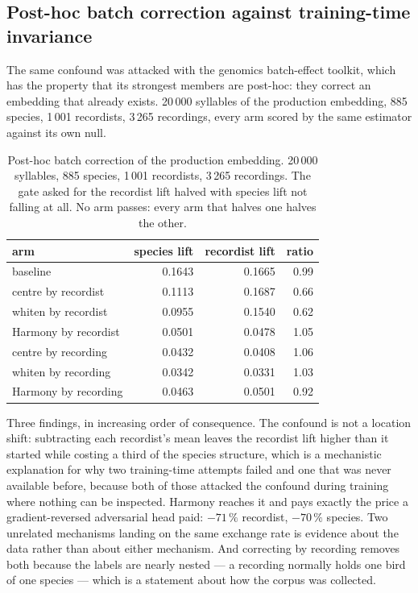 \documentclass[10pt,twocolumn,a4paper]{article}
\begin{document}
\subsection{Post-hoc batch correction against training-time invariance}

The same confound was attacked with the genomics batch-effect toolkit, which has the property
that its strongest members are post-hoc: they correct an embedding that already exists.
20\,000 syllables of the production embedding, 885 species, 1\,001 recordists, 3\,265
recordings, every arm scored by the same estimator against its own null.

\begin{table}[t]
\centering
\small
\caption{Post-hoc batch correction of the production embedding. 20\,000 syllables, 885
species, 1\,001 recordists, 3\,265 recordings. The gate asked for the recordist lift halved
with species lift not falling at all. No arm passes: every arm that halves one halves the
other.}
\label{tab:batch}
\begin{tabular}{L{5.6cm} r r r}
\toprule
arm & species lift & recordist lift & ratio \\
\midrule
baseline & 0.1643 & 0.1665 & 0.99 \\
centre by recordist & 0.1113 & 0.1687 & 0.66 \\
whiten by recordist & 0.0955 & 0.1540 & 0.62 \\
Harmony by recordist & 0.0501 & 0.0478 & 1.05 \\
centre by recording & 0.0432 & 0.0408 & 1.06 \\
whiten by recording & 0.0342 & 0.0331 & 1.03 \\
Harmony by recording & 0.0463 & 0.0501 & 0.92 \\
\bottomrule
\end{tabular}
\end{table}

Three findings, in increasing order of consequence. The confound is not a location shift:
subtracting each recordist's mean leaves the recordist lift higher than it started while
costing a third of the species structure, which is a mechanistic explanation for why two
training-time attempts failed and one that was never available before, because both of those
attacked the confound during training where nothing can be inspected. Harmony
\citep{korsunsky2019} reaches it and pays exactly the price a gradient-reversed adversarial
head paid: $-71\,\%$ recordist, $-70\,\%$ species. Two unrelated mechanisms landing on the
same exchange rate is evidence about the data rather than about either mechanism. And
correcting by recording removes both because the labels are nearly nested --- a recording
normally holds one bird of one species --- which is a statement about how the corpus was
collected.
\end{document}

